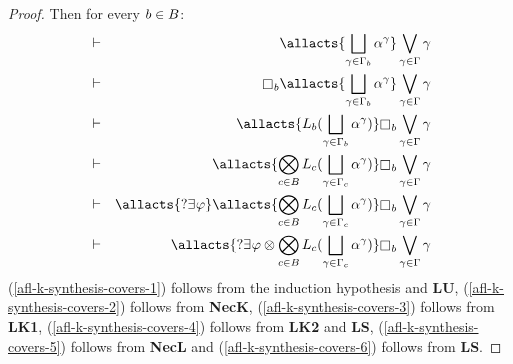 \begin{proof}
Then for every $b \in B$: 
\begin{eqnarray}
    &\proves& \allacts{\bigchoice_{\gamma \in \Gamma_\agentB} \alpha^\gamma} \bigvee_{\gamma \in \Gamma} \gamma\label{afl-k-synthesis-covers-1}\\
    &\proves& \necessary_\agentB \allacts{\bigchoice_{\gamma \in \Gamma_\agentB} \alpha^\gamma} \bigvee_{\gamma \in \Gamma} \gamma\label{afl-k-synthesis-covers-2}\\
    &\proves& \allacts{\learns_\agentB (\bigchoice_{\gamma \in \Gamma_\agentB} \alpha^\gamma)} \necessary_\agentB \bigvee_{\gamma \in \Gamma} \gamma\label{afl-k-synthesis-covers-3}\\
    &\proves& \allacts{\bigcompose_{\agentC \in \agentsB} \learns_\agentC (\bigchoice_{\gamma \in \Gamma_\agentC} \alpha^\gamma)} \necessary_\agentB \bigvee_{\gamma \in \Gamma} \gamma\label{afl-k-synthesis-covers-4}\\
    &\proves& \allacts{\test{\somerefs \phi}} \allacts{\bigcompose_{\agentC \in \agentsB} \learns_\agentC (\bigchoice_{\gamma \in \Gamma_\agentC} \alpha^\gamma)} \necessary_\agentB \bigvee_{\gamma \in \Gamma} \gamma\label{afl-k-synthesis-covers-5}\\
    &\proves& \allacts{\test{\somerefs \phi} \compose \bigcompose_{\agentC \in \agentsB} \learns_\agentC (\bigchoice_{\gamma \in \Gamma_\agentC} \alpha^\gamma)} \necessary_\agentB \bigvee_{\gamma \in \Gamma} \gamma\label{afl-k-synthesis-covers-6}
\end{eqnarray}
(\ref{afl-k-synthesis-covers-1}) follows from the induction hypothesis and {\bf LU},
(\ref{afl-k-synthesis-covers-2}) follows from {\bf NecK},
(\ref{afl-k-synthesis-covers-3}) follows from {\bf LK1},
(\ref{afl-k-synthesis-covers-4}) follows from {\bf LK2} and {\bf LS},
(\ref{afl-k-synthesis-covers-5}) follows from {\bf NecL} and
(\ref{afl-k-synthesis-covers-6}) follows from {\bf LS}.


\end{proof}
